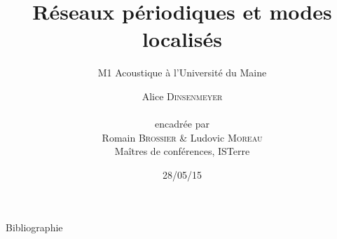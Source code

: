 \documentclass[12pt,xcolor=x11names,compress, notes=show]{beamer}%
\author{Alice \textsc{Dinsenmeyer} \\~\\ encadrée par\\ Romain \textsc{Brossier} \& Ludovic \textsc{Moreau} \\ Maîtres de conférences, ISTerre}
\title{ Réseaux périodiques et modes localisés}
\subtitle{M1 Acoustique à l'Université du Maine}
\date{28/05/15}
\begin{document}
\begin{frame}
	\titlepage 
\end{frame}

\begin{frame}
	\citep{alkhalifah}
\end{frame}



\begin{frame}{Bibliographie}


\end{frame}
\end{document}
